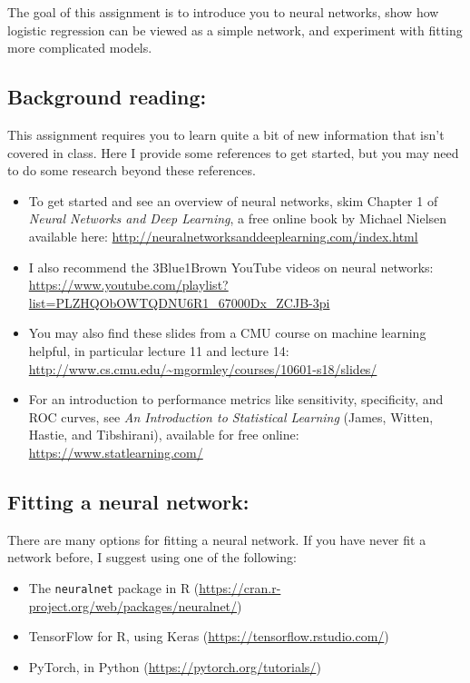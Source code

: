 \documentclass[11pt]{article}
\begin{document}
\noindent The goal of this assignment is to introduce you to neural networks, show how logistic regression can be viewed as a simple network, and experiment with fitting more complicated models.

\subsection*{Background reading:} This assignment requires you to learn quite a bit of new information that isn't covered in class. Here I provide some references to get started, but you may need to do some research beyond these references.

\begin{itemize}
\item To get started and see an overview of neural networks, skim Chapter 1 of \textit{Neural Networks and Deep Learning}, a free online book by Michael Nielsen available here: \url{http://neuralnetworksanddeeplearning.com/index.html}
\item I also recommend the 3Blue1Brown YouTube videos on neural networks: \url{https://www.youtube.com/playlist?list=PLZHQObOWTQDNU6R1_67000Dx_ZCJB-3pi}
\item You may also find these slides from a CMU course on machine learning helpful, in particular lecture 11 and lecture 14: \url{http://www.cs.cmu.edu/~mgormley/courses/10601-s18/slides/}
\item For an introduction to performance metrics like sensitivity, specificity, and ROC curves, see \textit{An Introduction to Statistical Learning} (James, Witten, Hastie, and Tibshirani), available for free online: \url{https://www.statlearning.com/}
\end{itemize}

\subsection*{Fitting a neural network:} There are many options for fitting a neural network. If you have never fit a network before, I suggest using one of the following:

\begin{itemize}
\item The \texttt{neuralnet} package in R (\url{https://cran.r-project.org/web/packages/neuralnet/})
\item TensorFlow for R, using Keras (\url{https://tensorflow.rstudio.com/})
\item PyTorch, in Python (\url{https://pytorch.org/tutorials/})
\end{itemize}
\end{document}
